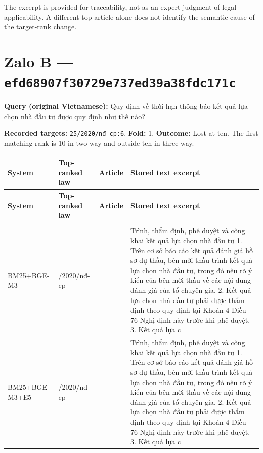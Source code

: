 The excerpt is provided for traceability, not as an expert judgment of legal applicability. A different top article alone does not identify the semantic cause of the target-rank change.

\section{Zalo B — \texttt{efd68907\allowbreak{}f30729e7\allowbreak{}37ed39a3\allowbreak{}8fdc171c}}

\textbf{Query (original Vietnamese):} Quy định về thời hạn thông báo kết quả lựa chọn nhà đầu tư được quy định như thế nào?

\textbf{Recorded targets:} \texttt{25/2020/\allowbreak{}nđ-cp:6}. \textbf{Fold:} 1. \textbf{Outcome:} Lost at ten. The first matching rank is 10 in two-way and outside ten in three-way.

\begingroup
\scriptsize
\setlength{\tabcolsep}{2pt}
\renewcommand{\arraystretch}{1.0}
\begin{longtable}{>{\raggedright\arraybackslash}p{2.022cm}>{\raggedright\arraybackslash}p{2.022cm}>{\raggedright\arraybackslash}p{1.891cm}>{\raggedright\arraybackslash}p{9.185cm}}
\toprule
\textbf{System} & \textbf{Top-ranked law} & \textbf{Article} & \textbf{Stored text excerpt} \\
\midrule
\endfirsthead
\toprule
\textbf{System} & \textbf{Top-ranked law} & \textbf{Article} & \textbf{Stored text excerpt} \\
\midrule
\endhead
\midrule
\multicolumn{4}{r}{\footnotesize Continued on next page}\\
\endfoot
\bottomrule
\endlastfoot
BM25+\allowbreak{}BGE-M3 & 25/\allowbreak{}2020/\allowbreak{}nđ-cp & 43 & Trình, thẩm định, phê duyệt và công khai kết quả lựa chọn nhà đầu tư    1. Trên cơ sở báo cáo kết quả đánh giá hồ sơ dự thầu, bên mời thầu trình kết quả lựa chọn nhà đầu tư, trong đó nêu rõ ý kiến của bên mời thầu về các nội dung đánh giá của tổ chuyên gia.    2. Kết quả lựa chọn nhà đầu tư phải được thẩm định theo quy định tại Khoản 4 Điều 76 Nghị định này trước khi phê duyệt.    3. Kết quả lựa c \\
BM25+\allowbreak{}BGE-M3+\allowbreak{}E5 & 25/\allowbreak{}2020/\allowbreak{}nđ-cp & 43 & Trình, thẩm định, phê duyệt và công khai kết quả lựa chọn nhà đầu tư    1. Trên cơ sở báo cáo kết quả đánh giá hồ sơ dự thầu, bên mời thầu trình kết quả lựa chọn nhà đầu tư, trong đó nêu rõ ý kiến của bên mời thầu về các nội dung đánh giá của tổ chuyên gia.    2. Kết quả lựa chọn nhà đầu tư phải được thẩm định theo quy định tại Khoản 4 Điều 76 Nghị định này trước khi phê duyệt.    3. Kết quả lựa c \\
\end{longtable}
\endgroup

